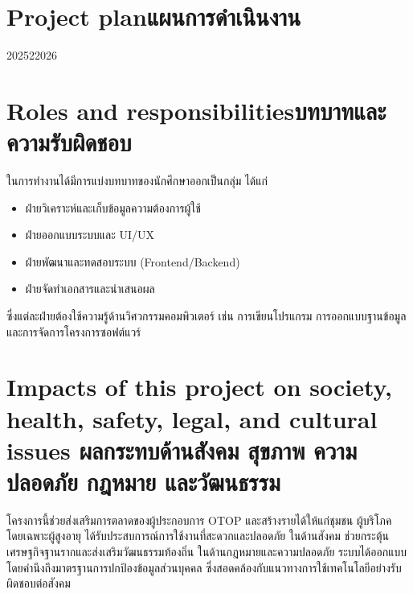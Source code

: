 \section{\ifenglish Project plan\else แผนการดำเนินงาน\fi}
\begin{plan}{6}{2025}{2}{2026}
\end{plan}

\section{\ifenglish Roles and responsibilities\else บทบาทและความรับผิดชอบ\fi}
ในการทำงานได้มีการแบ่งบทบาทของนักศึกษาออกเป็นกลุ่ม ได้แก่  
\begin{itemize}
    \item ฝ่ายวิเคราะห์และเก็บข้อมูลความต้องการผู้ใช้
    \item ฝ่ายออกแบบระบบและ UI/UX
    \item ฝ่ายพัฒนาและทดสอบระบบ (Frontend/Backend)
    \item ฝ่ายจัดทำเอกสารและนำเสนอผล
\end{itemize}
ซึ่งแต่ละฝ่ายต้องใช้ความรู้ด้านวิศวกรรมคอมพิวเตอร์ 
เช่น การเขียนโปรแกรม การออกแบบฐานข้อมูล และการจัดการโครงการซอฟต์แวร์

\section{\ifenglish%
Impacts of this project on society, health, safety, legal, and cultural issues
\else%
ผลกระทบด้านสังคม สุขภาพ ความปลอดภัย กฎหมาย และวัฒนธรรม
\fi}
โครงการนี้ช่วยส่งเสริมการตลาดของผู้ประกอบการ OTOP และสร้างรายได้ให้แก่ชุมชน  
ผู้บริโภค โดยเฉพาะผู้สูงอายุ ได้รับประสบการณ์การใช้งานที่สะดวกและปลอดภัย  
ในด้านสังคม ช่วยกระตุ้นเศรษฐกิจฐานรากและส่งเสริมวัฒนธรรมท้องถิ่น  
ในด้านกฎหมายและความปลอดภัย ระบบได้ออกแบบโดยคำนึงถึงมาตรฐานการปกป้องข้อมูลส่วนบุคคล  
ซึ่งสอดคล้องกับแนวทางการใช้เทคโนโลยีอย่างรับผิดชอบต่อสังคม
